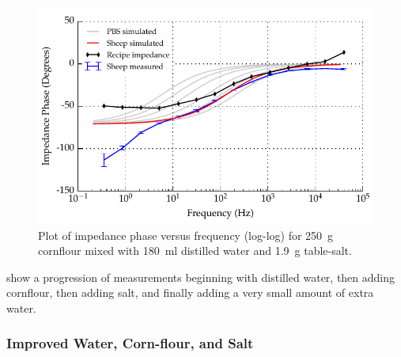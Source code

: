 \begin{figure}
    \centering
    \includegraphics[width=\textwidth]{content/pt2/graphics/run14_180ml-distilledWater_250g-cornflour_1g9-salt_ZVsF_graph_phase}
    \caption{\label{fig:recipe_cornflour_salt_extraWater_phase}Plot of impedance phase versus frequency (log-log) for \SI{250}{\gram} cornflour mixed with \SI{180}{\milli\litre} distilled water and \SI{1.9}{\gram} table-salt.}
\end{figure}

 show a progression of measurements beginning with distilled water, then adding cornflour, then adding salt, and finally adding a very small amount of extra water.

\subsubsection*{Improved Water, Corn-flour, and Salt}

